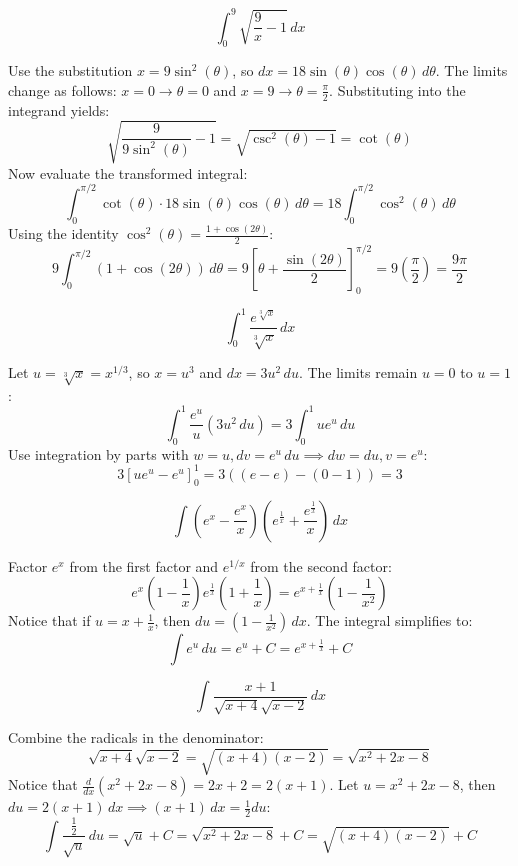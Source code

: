 \begin{questions}
\question
\[ \int_0^9 \sqrt{\frac{9}{x} - 1} \, dx \]
\begin{solution}
Use the substitution $x = 9 \sin^2(\theta)$, so $dx = 18 \sin(\theta) \cos(\theta) \, d\theta$.
The limits change as follows: $x = 0 \to \theta = 0$ and $x = 9 \to \theta = \frac{\pi}{2}$.
Substituting into the integrand yields:
\[ \sqrt{\frac{9}{9\sin^2(\theta)} - 1} = \sqrt{\csc^2(\theta) - 1} = \cot(\theta) \]
Now evaluate the transformed integral:
\[ \int_0^{\pi/2} \cot(\theta) \cdot 18 \sin(\theta) \cos(\theta) \, d\theta = 18 \int_0^{\pi/2} \cos^2(\theta) \, d\theta \]
Using the identity $\cos^2(\theta) = \frac{1 + \cos(2\theta)}{2}$:
\[ 9 \int_0^{\pi/2} (1 + \cos(2\theta)) \, d\theta = 9 \left[ \theta + \frac{\sin(2\theta)}{2} \right]_0^{\pi/2} = 9 \left( \frac{\pi}{2} \right) = \frac{9\pi}{2} \]
\end{solution}

\question
\[ \int_0^1 \frac{e^{\sqrt[3]{x}}}{\sqrt[3]{x}} \, dx \]
\begin{solution}
Let $u = \sqrt[3]{x} = x^{1/3}$, so $x = u^3$ and $dx = 3u^2 \, du$.
The limits remain $u = 0$ to $u = 1$:
\[ \int_0^1 \frac{e^u}{u} (3u^2 \, du) = 3 \int_0^1 u e^u \, du \]
Use integration by parts with $w = u, dv = e^u \, du \implies dw = du, v = e^u$:
\[ 3 \left[ u e^u - e^u \right]_0^1 = 3 \left( (e - e) - (0 - 1) \right) = 3 \]
\end{solution}

\question
\[ \int \left(e^x - \frac{e^x}{x}\right) \left(e^{\frac{1}{x}} + \frac{e^{\frac{1}{x}}}{x}\right) \, dx \]
\begin{solution}
Factor $e^x$ from the first factor and $e^{1/x}$ from the second factor:
\[ e^x \left(1 - \frac{1}{x}\right) e^{\frac{1}{x}} \left(1 + \frac{1}{x}\right) = e^{x + \frac{1}{x}} \left(1 - \frac{1}{x^2}\right) \]
Notice that if $u = x + \frac{1}{x}$, then $du = \left(1 - \frac{1}{x^2}\right) \, dx$.
The integral simplifies to:
\[ \int e^u \, du = e^u + C = e^{x + \frac{1}{x}} + C \]
\end{solution}

\question
\[ \int \frac{x+1}{\sqrt{x+4}\sqrt{x-2}} \, dx \]
\begin{solution}
Combine the radicals in the denominator:
\[ \sqrt{x+4}\sqrt{x-2} = \sqrt{(x+4)(x-2)} = \sqrt{x^2 + 2x - 8} \]
Notice that $\frac{d}{dx}(x^2 + 2x - 8) = 2x + 2 = 2(x + 1)$.
Let $u = x^2 + 2x - 8$, then $du = 2(x + 1) \, dx \implies (x+1) \, dx = \frac{1}{2} du$:
\[ \int \frac{\frac{1}{2}}{\sqrt{u}} \, du = \sqrt{u} + C = \sqrt{x^2 + 2x - 8} + C = \sqrt{(x+4)(x-2)} + C \]
\end{solution}


\end{questions}
